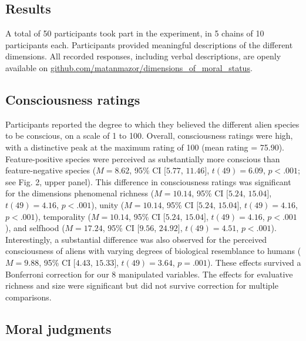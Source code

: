 \documentclass[10pt, letterpaper]{article}
\begin{document}
\hypertarget{results}{%
\subsection{Results}\label{results}}

A total of 50 participants took part in the experiment, in 5 chains of
10 participants each. Participants provided meaningful descriptions of
the different dimensions. All recorded responses, including verbal
descriptions, are openly available on
\href{https://github.com/matanmazor/dimensions_of_moral_status}{github.com/matanmazor/dimensions\_of\_moral\_status}.

\hypertarget{consciousness-ratings}{%
\subsection{Consciousness ratings}\label{consciousness-ratings}}

Participants reported the degree to which they believed the different
alien species to be conscious, on a scale of 1 to 100. Overall,
consciousness ratings were high, with a distinctive peak at the maximum
rating of 100 (mean rating = 75.90). Feature-positive species were
perceived as substantially more conscious than feature-negative species
(\(M = 8.62\), 95\% CI \([5.77\), \(11.46]\), \(t(49) = 6.09\),
\(p < .001\); see Fig. 2, upper panel). This difference in consciousness
ratings was significant for the dimensions phenomenal richness
(\(M = 10.14\), 95\% CI \([5.24\), \(15.04]\), \(t(49) = 4.16\),
\(p < .001\)), unity (\(M = 10.14\), 95\% CI \([5.24\), \(15.04]\),
\(t(49) = 4.16\), \(p < .001\)), temporality (\(M = 10.14\), 95\% CI
\([5.24\), \(15.04]\), \(t(49) = 4.16\), \(p < .001\)), and selfhood
(\(M = 17.24\), 95\% CI \([9.56\), \(24.92]\), \(t(49) = 4.51\),
\(p < .001\)). Interestingly, a substantial difference was also observed
for the perceived consciousness of aliens with varying degrees of
biological resemblance to humans (\(M = 9.88\), 95\% CI \([4.43\),
\(15.33]\), \(t(49) = 3.64\), \(p = .001\)). These effects survived a
Bonferroni correction for our 8 manipulated variables. The effects for
evaluative richness and size were significant but did not survive
correction for multiple comparisons.

\hypertarget{moral-judgments}{%
\subsection{Moral judgments}\label{moral-judgments}}
\end{document}
